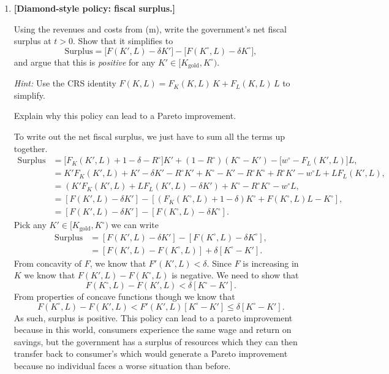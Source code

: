 \documentclass[11pt,english]{article}
\begin{document}
\begin{enumerate}
    \item[(n)] \textbf{[Diamond-style policy: fiscal surplus.]}
 
        Using the revenues and costs from (m), write the government's net fiscal
        surplus at $t > 0$. Show that it simplifies to
        \[
            \text{Surplus} = \bigl[F(K', L) - \delta K'\bigr]
            - \bigl[F(K^\circ, L) - \delta K^\circ\bigr],
        \]
        and argue that this is \textit{positive} for any $K' \in [K_{\mathrm{gold}},
        K^\circ)$.
 
        \textit{Hint:} Use the CRS identity $F(K, L) = F_K(K, L)\, K +
        F_L(K, L)\, L$ to simplify.
 
        Explain why this policy can lead to a Pareto improvement.
    \begin{solution}
 To write out the net fiscal surplus, we just have to sum all the terms up together.
\begin{align*}
\text{Surplus} & = \bigl[F_K(K', L) + 1 - \delta - R^\circ\bigr] K' + (1 - R^\circ) (K^\circ - K') - \bigl[w^\circ - F_L(K',L)\bigr] L,\\
&= K'F_K(K',L) + K' - \delta K' - R^\circ K' + K^\circ - K' - R^\circ K^\circ + R^\circ K' - w^\circ L + LF_L(K',L),\\
&= (K'F_K(K',L) + LF_L(K',L) - \delta K')  + K^\circ - R^\circ K^\circ  - w^\circ L ,\\
&= [F(K',L) - \delta K']  - [(F_K(K^\circ, L) + 1 - \delta)K^\circ  + F(K^\circ, L) L - K^\circ]  ,\\
&= [F(K',L) - \delta K']  - [F(K^\circ, L)- \delta K^\circ] .
\end{align*}Pick any $K'\in [K_{\mathrm{gold}}, K^\circ)$ we can write
\begin{align*}
\text{Surplus} & = [F(K',L) - \delta K']  - [F(K^\circ, L)- \delta K^\circ], \\
& = [F(K',L) - F(K^\circ, L)] + \delta[K^\circ - K'] .
\end{align*} From concavity of $F$, we know that $F'(K', L) < \delta$. Since $F$ is increasing in $K$ we know that $F(K',L) - F(K^\circ, L)$ is negative. We need to show that $$F(K^\circ, L) - F(K',L) < \delta[K^\circ - K'].$$ From properties of concave functions though we know that $$F(K^\circ, L) - F(K',L) <  F'(K', L)[K^\circ - K'] \leq \delta[K^\circ - K'].$$ As such, surplus is positive. This policy can lead to a pareto improvement because in this world, consumers experience the same wage and return on savings, but the government has a surplus of resources which they can then transfer back to consumer's which would generate a Pareto improvement because no individual faces a worse situation than before.
    \end{solution}
\end{enumerate}
\end{document}

